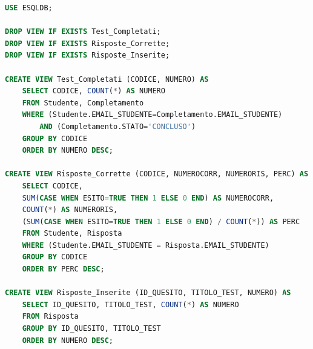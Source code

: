 \documentclass{article}
\begin{document}
\begin{lstlisting}[language=SQL, title=Codice SQL completo delle view dello schema della basi di dati.]
USE ESQLDB;

DROP VIEW IF EXISTS Test_Completati;
DROP VIEW IF EXISTS Risposte_Corrette;
DROP VIEW IF EXISTS Risposte_Inserite;

CREATE VIEW Test_Completati (CODICE, NUMERO) AS
    SELECT CODICE, COUNT(*) AS NUMERO
    FROM Studente, Completamento
    WHERE (Studente.EMAIL_STUDENTE=Completamento.EMAIL_STUDENTE) 
		AND (Completamento.STATO='CONCLUSO')
	GROUP BY CODICE
    ORDER BY NUMERO DESC;
   
CREATE VIEW Risposte_Corrette (CODICE, NUMEROCORR, NUMERORIS, PERC) AS
    SELECT CODICE, 
    SUM(CASE WHEN ESITO=TRUE THEN 1 ELSE 0 END) AS NUMEROCORR,
    COUNT(*) AS NUMERORIS,
    (SUM(CASE WHEN ESITO=TRUE THEN 1 ELSE 0 END) / COUNT(*)) AS PERC
    FROM Studente, Risposta
    WHERE (Studente.EMAIL_STUDENTE = Risposta.EMAIL_STUDENTE)
    GROUP BY CODICE
    ORDER BY PERC DESC;

CREATE VIEW Risposte_Inserite (ID_QUESITO, TITOLO_TEST, NUMERO) AS
    SELECT ID_QUESITO, TITOLO_TEST, COUNT(*) AS NUMERO
    FROM Risposta
    GROUP BY ID_QUESITO, TITOLO_TEST
    ORDER BY NUMERO DESC;
\end{lstlisting}
\end{document}
